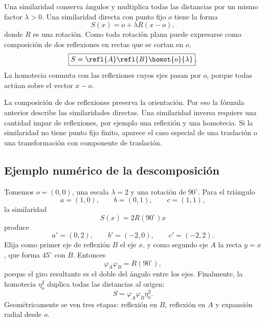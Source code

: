 Una similaridad conserva ángulos y multiplica todas las distancias por un mismo factor
\(\lambda>0\). Una similaridad directa con punto fijo \(o\) tiene la forma
\[
  S(x)=o+\lambda R(x-o),
\]
donde \(R\) es una rotación. Como toda rotación plana puede expresarse como composición de
dos reflexiones en rectas que se cortan en \(o\),
\[
  \boxed{S=\refl{A}\refl{B}\homot{o}{\lambda}}.
\]
La homotecia conmuta con las reflexiones cuyos ejes pasan por \(o\), porque todas actúan
sobre el vector \(x-o\).

\begin{center}
\end{center}

\begin{atencion}
La composición de dos reflexiones preserva la orientación. Por eso la fórmula anterior
describe las similaridades directas. Una similaridad inversa requiere una cantidad impar de
reflexiones, por ejemplo una reflexión y una homotecia. Si la similaridad no tiene punto fijo
finito, aparece el caso especial de una traslación o una transformación con componente de
traslación.
\end{atencion}

\subsection{Ejemplo numérico de la descomposición}

Tomemos \(o=(0,0)\), una escala \(\lambda=2\) y una rotación de \(90^\circ\). Para el
triángulo
\[
  a=(1,0),\qquad b=(0,1),\qquad c=(1,1),
\]
la similaridad
\[
  S(x)=2R(90^\circ)x
\]
produce
\[
  a'=(0,2),\qquad b'=(-2,0),\qquad c'=(-2,2).
\]
Elija como primer eje de reflexión \(B\) el eje \(x\), y como segundo eje \(A\) la recta
\(y=x\), que forma \(45^\circ\) con \(B\). Entonces
\[
  \varphi_A\varphi_B=R(90^\circ),
\]
porque el giro resultante es el doble del ángulo entre los ejes. Finalmente, la homotecia
\(\eta_o^2\) duplica todas las distancias al origen:
\[
  \boxed{S=\varphi_A\varphi_B\eta_o^2}.
\]
Geométricamente se ven tres etapas: reflexión en \(B\), reflexión en \(A\) y expansión radial
desde \(o\).

